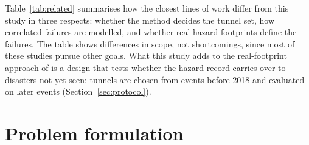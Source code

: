 \documentclass[preprint,12pt]{elsarticle}
\begin{document}
Table~\ref{tab:related} summarises how the closest lines of work differ from this study in three respects: whether the method decides the tunnel set, how correlated failures are modelled, and whether real hazard footprints define the failures. The table shows differences in scope, not shortcomings, since most of these studies pursue other goals. What this study adds to the real-footprint approach of \cite{alenazi23} is a design that tests whether the hazard record carries over to disasters not yet seen: tunnels are chosen from events before 2018 and evaluated on later events (Section~\ref{sec:protocol}).

\begin{table}[t]
\centering
\caption{Positioning against the closest published work. ``Real hazard footprints'' means archived spatial records of actual hazards used to define which elements fail.}
\label{tab:related}
\small
{}
\end{table}

\section{Problem formulation}
\label{sec:problem}
\end{document}
